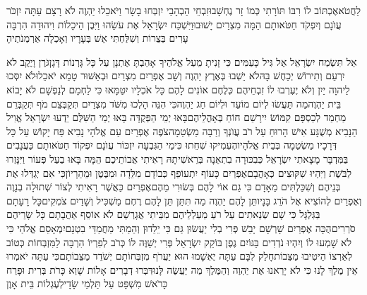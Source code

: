 \documentclass[../main/main.tex]{subfiles}
\begin{document}
\begin{multicols*}{\ncols}
לַחֲטֹא\PreVerseSpace{}אֶכְתּוֹב לוֹ רִבּוֹ תּוֹרָתִי כְּמוֹ זָר נֶחְשָׁבוּ\PreVerseSpace{}זִבְחֵי הַבְהָבַי יִזְבְּחוּ בָשָׂר וַיֹּאכֵלוּ יַהְוֶה לֹא רָצָם עַתָּה יִזְכֹּר עֲוֺנָם וְיִפְקֹד חַטֹּאותָם הֵמָּה מִצְרַיִם יָשׁוּבוּ\PreVerseSpace{}וַיִּשְׁכַּח יִשְׂרָאֵל אֶת עֹשֵׂהוּ וַיִּבֶן הֵיכָלוֹת וִיהוּדָה הִרְבָּה עָרִים בְּצֻרוֹת וְשִׁלַּחְתִּי אֵשׁ בְּעָרָיו וְאָכְלָה אַרְמְנֹתֶיהָ\OpenSection{}\par
{}אַל תִּשְׂמַח יִשְׂרָאֵל אֶל גִּיל כָּעַמִּים כִּי זָנִיתָ מֵעַל אֱלֹהֶיךָ אָהַבְתָּ אֶתְנָן עַל כָּל גָּרְנוֹת דָּגָן\PreVerseSpace{}גֹּרֶן וָיֶקֶב לֹא יִרְעֵם וְתִירוֹשׁ יְכַחֶשׁ בָּהּ\PreVerseSpace{}לֹא יֵשְׁבוּ בְּאֶרֶץ יַהְוֶה וְשָׁב אֶפְרַיִם מִצְרַיִם וּבְאַשּׁוּר טָמֵא יֹאכֵלוּ\PreVerseSpace{}לֹא יִסְּכוּ לַיהוָה יַיִן וְלֹא יֶעֶרְבוּ לוֹ זִבְחֵיהֶם כְּלֶחֶם אוֹנִים לָהֶם כָּל אֹכְלָיו יִטַּמָּאוּ כִּי לַחְמָם לְנַפְשָׁם לֹא יָבוֹא בֵּית יַהְוֶה\PreVerseSpace{}מַה תַּעֲשׂוּ לְיוֹם מוֹעֵד וּלְיוֹם חַג יַהְוֶה\PreVerseSpace{}כִּי הִנֵּה הָלְכוּ מִשֹּׁד מִצְרַיִם תְּקַבְּצֵם מֹף תְּקַבְּרֵם מַחְמַד לְכַסְפָּם קִמּוֹשׂ יִירָשֵׁם חוֹחַ בְּאָהֳלֵיהֶם\PreVerseSpace{}בָּאוּ יְמֵי הַפְּקֻדָּה בָּאוּ יְמֵי הַשִּׁלֻּם יֵדְעוּ יִשְׂרָאֵל אֱוִיל הַנָּבִיא מְשֻׁגָּע אִישׁ הָרוּחַ עַל רֹב עֲוֺנְךָ וְרַבָּה מַשְׂטֵמָה\PreVerseSpace{}צֹפֶה אֶפְרַיִם עַם\SubEnd{} אֱלֹהָי נָבִיא פַּח יָקוֹשׁ עַל כָּל דְּרָכָיו מַשְׂטֵמָה בְּבֵית אֱלֹהָיו\PreVerseSpace{}הֶעְמִיקוּ שִׁחֵתוּ כִּימֵי הַגִּבְעָה יִזְכּוֹר עֲוֺנָם יִפְקוֹד חַטֹּאותָם \ClosedSection{}כַּעֲנָבִים בַּמִּדְבָּר מָצָאתִי יִשְׂרָאֵל כְּבִכּוּרָה בִתְאֵנָה בְּרֵאשִׁיתָהּ רָאִיתִי אֲבוֹתֵיכֶם הֵמָּה בָּאוּ בַעַל פְּעוֹר וַיִּנָּזְרוּ לַבֹּשֶׁת וַיִּהְיוּ שִׁקּוּצִים כְּאָהֳבָם\PreVerseSpace{}אֶפְרַיִם כָּעוֹף יִתְעוֹפֵף כְּבוֹדָם מִלֵּדָה וּמִבֶּטֶן וּמֵהֵרָיוֹן\PreVerseSpace{}כִּי אִם יְגַדְּלוּ אֶת בְּנֵיהֶם וְשִׁכַּלְתִּים מֵאָדָם כִּי גַם אוֹי לָהֶם בְּשׂוּרִי מֵהֶם\PreVerseSpace{}אֶפְרַיִם כַּאֲשֶׁר רָאִיתִי לְצוֹר שְׁתוּלָה בְנָוֶה וְאֶפְרַיִם לְהוֹצִיא אֶל הֹרֵג בָּנָיו\PreVerseSpace{}תֵּן לָהֶם יַהְוֶה מַה תִּתֵּן תֵּן לָהֶם רֶחֶם מַשְׁכִּיל וְשָׁדַיִם צֹמְקִים\PreVerseSpace{}כָּל רָעָתָם בַּגִּלְגָּל כִּי שָׁם שְׂנֵאתִים עַל רֹעַ מַעַלְלֵיהֶם מִבֵּיתִי אֲגָרְשֵׁם לֹא אוֹסֵף אַהֲבָתָם כָּל שָׂרֵיהֶם סֹרְרִים\PreVerseSpace{}הֻכָּה אֶפְרַיִם שָׁרְשָׁם יָבֵשׁ פְּרִי בְלִי יַעֲשׂוּן גַּם כִּי יֵלֵדוּן וְהֵמַתִּי מַחֲמַדֵּי בִטְנָם\PreVerseSpace{}יִמְאָסֵם אֱלֹהַי כִּי לֹא שָׁמְעוּ לוֹ וְיִהְיוּ נֹדְדִים בַּגּוֹיִם \ClosedSection{}גֶּפֶן בּוֹקֵק יִשְׂרָאֵל פְּרִי יְשַׁוֶּה לּוֹ כְּרֹב לְפִרְיוֹ הִרְבָּה לַמִּזְבְּחוֹת כְּטוֹב לְאַרְצוֹ הֵיטִיבוּ מַצֵּבוֹת\PreVerseSpace{}חָלַק לִבָּם עַתָּה יֶאְשָׁמוּ הוּא יַעֲרֹף מִזְבְּחוֹתָם יְשֹׁדֵד מַצֵּבוֹתָם\PreVerseSpace{}כִּי עַתָּה יֹאמְרוּ אֵין מֶלֶךְ לָנוּ כִּי לֹא יָרֵאנוּ אֶת יַהְוֶה וְהַמֶּלֶךְ מַה יַּעֲשֶׂה לָּנוּ\PreVerseSpace{}דִּבְּרוּ דְבָרִים אָלוֹת שָׁוְא כָּרֹת בְּרִית וּפָרַח כָּרֹאשׁ מִשְׁפָּט עַל תַּלְמֵי שָׂדָי\PreVerseSpace{}לְעֶגְלוֹת בֵּית אָוֶן 
\end{multicols*}
\end{document}
